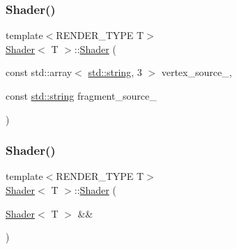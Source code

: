 \mbox{\label{classShader_ae93db4f8280ee456ca13eaa7b9c47ec5}} 
\subsubsection{\texorpdfstring{Shader()}{Shader()}\hspace{0.1cm}{\footnotesize\ttfamily [2/4]}}
{\footnotesize\ttfamily template$<$R\+E\+N\+D\+E\+R\+\_\+\+T\+Y\+PE T$>$ \\
\mbox{\hyperlink{classShader}{Shader}}$<$ T $>$\+::\mbox{\hyperlink{classShader}{Shader}} (\begin{DoxyParamCaption}\item[{const std\+::array$<$ \mbox{\hyperlink{glad_8h_ac83513893df92266f79a515488701770}{std\+::string}}, 3 $>$}]{vertex\+\_\+source\+\_\+,  }\item[{const \mbox{\hyperlink{glad_8h_ac83513893df92266f79a515488701770}{std\+::string}}}]{fragment\+\_\+source\+\_\+ }\end{DoxyParamCaption})\hspace{0.3cm}{\ttfamily [inline]}}

\mbox{\label{classShader_a7e30078f161d1c9f48a7b3921c01f816}} 
\subsubsection{\texorpdfstring{Shader()}{Shader()}\hspace{0.1cm}{\footnotesize\ttfamily [3/4]}}
{\footnotesize\ttfamily template$<$R\+E\+N\+D\+E\+R\+\_\+\+T\+Y\+PE T$>$ \\
\mbox{\hyperlink{classShader}{Shader}}$<$ T $>$\+::\mbox{\hyperlink{classShader}{Shader}} (\begin{DoxyParamCaption}\item[{\mbox{\hyperlink{classShader}{Shader}}$<$ T $>$ \&\&}]{ }\end{DoxyParamCaption})\hspace{0.3cm}{\ttfamily [delete]}}

\mbox{\label{classShader_a49b2a448a00b5e1413c17501f8873cca}} 
